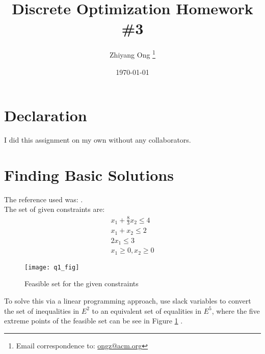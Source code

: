 \documentclass[letter,12pt]{article}
\begin{document}
\title{Discrete Optimization Homework \#3}
\date{\today}
\author{Zhiyang Ong
	\thanks{Email correspondence to: \href{mailto:ongz@acm.org}{ongz@acm.org}}
}
\maketitle






\section*{Declaration}
\label{sec:declaration}

I did this assignment on my own without any collaborators. %







\section{Finding Basic Solutions}
\label{sec:findingbasicsolutions}

The reference used was: \cite[\S2.5, pages 25--27]{Luenberger2008}. \\

The set of given constraints are:
\begin{eqnarray*}
x_{1} + \frac{8}{3}x_{2} \leq 4 \\
x_{1} + x_{2} \leq 2 \\
2x_{1} \leq 3 \\
x_{1} \geq 0, x_{2} \geq 0
\end{eqnarray*}

\begin{figure}
\centering 
\texttt{[image: q1\_fig]}
\caption{Feasible set for the given constraints \cite[\S2.5, page 27]{Luenberger2008}}
\label{fig:q1feasibleset}
\end{figure}

To solve this via a linear programming approach, use slack variables to convert the set of inequalities in $E^{2}$ to an equivalent set of equalities in $E^{5}$, where the five extreme points of the feasible set can be see in Figure \ref{fig:q1feasibleset} \cite[\S2.1, pages 12]{Luenberger2008}. \\
\end{document}

